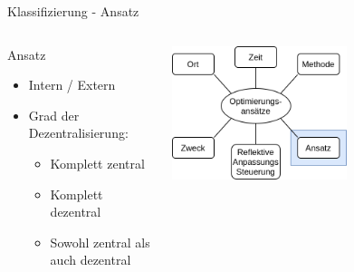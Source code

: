 \documentclass[de,16:9]{sdqbeamer}
\begin{document}
\begin{frame}{Klassifizierung - Ansatz}
	\begin{columns}
		 \begin{center}
			\begin{greenblock}{Ansatz}
				\begin{itemize}
					\item Intern / Extern
					\item Grad der Dezentralisierung:
					\begin{itemize}
						\item Komplett zentral
						\item Komplett dezentral
						\item Sowohl zentral als auch dezentral
					\end{itemize}
				\end{itemize}
			\end{greenblock}
		\end{center}
		 \begin{center}
			\includegraphics[width=0.6\textwidth]{sources/ClassificationProposal-Proposal_DE_Approach.png}
		\end{center}
	\end{columns}
\end{frame}
\end{document}
